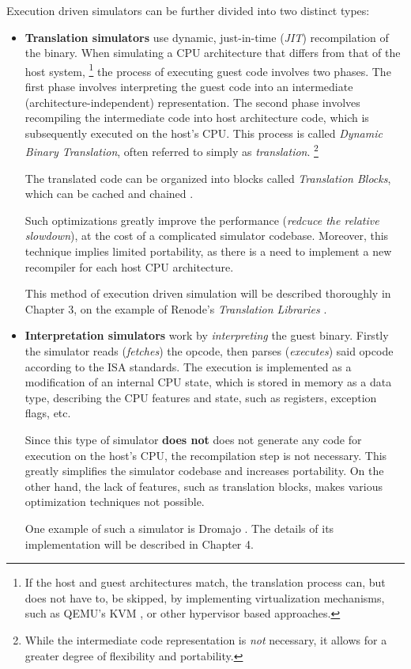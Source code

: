 Execution driven simulators can be further divided into two distinct types:

\begin{itemize}
	\item{\textbf{Translation simulators} use dynamic, just-in-time (\textit{JIT}) recompilation of the binary.
	When simulating a CPU architecture that differs from that of the host system,%
	\footnote{If the host and guest architectures match, the translation process can, but does not have to, be skipped,
	by implementing virtualization mechanisms, such as QEMU's KVM \cite{QemuKVM}, or other hypervisor based approaches.}
	the process of executing guest code involves two phases. The first phase involves interpreting the guest code into
	an intermediate (architecture-independent) representation. The second phase involves recompiling the intermediate
	code into host architecture code, which is subsequently executed on the host's CPU. This process is called
	\textit{Dynamic Binary Translation}, often referred to simply as \textit{translation}.%
	\footnote{While the intermediate code representation is \textit{not} necessary, it allows for a greater degree of
	flexibility and portability.}

	The translated code can be organized into blocks called \textit{Translation Blocks}, which can be cached and
	chained \cite{Qemu}.

	Such optimizations greatly improve the performance (\textit{redcuce the relative slowdown}), at the
	cost of a complicated simulator codebase. Moreover, this technique implies limited portability, as there is a need
	to implement a new recompiler for each host CPU architecture.

	This method of execution driven simulation will be described thoroughly in Chapter 3, on the example of Renode's
	\textit{Translation Libraries} \cite{Tlib}.}
	\item{\textbf{Interpretation simulators} work by \textit{interpreting} the guest binary. Firstly the simulator
	reads (\textit{fetches}) the opcode, then parses (\textit{executes}) said opcode according to the ISA standards.
	The execution is implemented as a modification of an internal CPU state, which is stored in memory as a data type,
	describing the CPU features and state, such as registers, exception flags, etc.

	Since this type of simulator \textbf{does not} does not generate any code for execution on the host's CPU, the recompilation step is not
	necessary. This greatly simplifies the simulator codebase and increases portability. On the other hand, the lack of
	features, such as translation blocks, makes various optimization techniques not possible.

	One example of such a simulator is Dromajo \cite{Dromajo}. The details of its implementation will be described in
	Chapter 4.}
\end{itemize}



